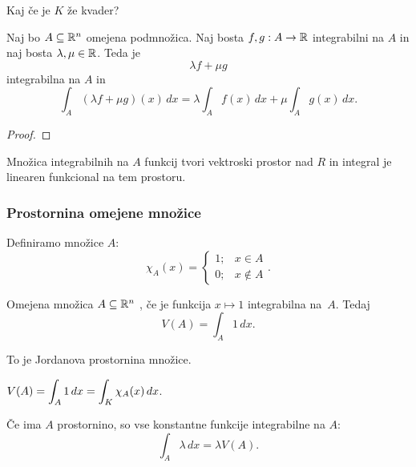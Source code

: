 \begin{opomba}
    Kaj če je \(K\) že kvader? \todo
\end{opomba}

\begin{zgled}
    \todo
\end{zgled}

\begin{trditev}
    Naj bo \(A \subseteq \mathbb{R}^n\) omejena podmnožica. Naj bosta \(f, g : A \to \mathbb{R}\) integrabilni na \(A\) in naj bosta \(\lambda, \mu \in \mathbb{R}\). Teda je \[\lambda f + \mu g\] integrabilna na \(A\) in \[\int_A (\lambda f + \mu g)(x) \, dx = \lambda \int_A f(x) \, dx + \mu  \int_A g(x) \, dx.\]
\end{trditev}
\begin{proof}
    \todo
\end{proof}
\begin{opomba}
    Množica integrabilnih na \(A\) funkcij tvori vektroski prostor nad \(R\) in integral je linearen funkcional na tem prostoru.
\end{opomba}

\subsubsection{Prostornina omejene množice}
Definiramo  množice \(A\): \[\chi_A(x) = \begin{cases}
    1; &x \in A \\ 0; &x \notin A
\end{cases}.\]

\begin{definicija}
    Omejena množica \(A \subseteq \mathbb{R}^n\) , če je funkcija \(x \mapsto 1\) integrabilna na~\(A\). Tedaj \[V(A) = \int_A 1 \, dx.\] 
\end{definicija}

\begin{opomba}
    To je Jordanova prostornina množice.
\end{opomba}

\begin{opomba}
    \(\displaystyle V(A) = \int_A 1 \, dx = \int_K \chi_A(x) \, dx\).
\end{opomba}

\begin{opomba}
    Če ima \(A\) prostornino, so vse konstantne funkcije integrabilne na \(A\): \[\int_A \lambda \, dx = \lambda V(A).\]
\end{opomba}

